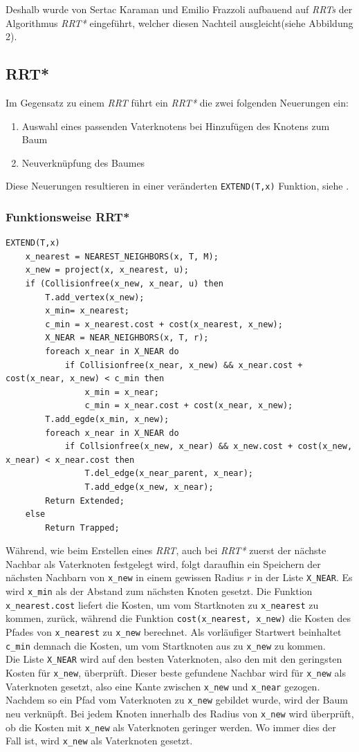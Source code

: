 Deshalb wurde von Sertac Karaman und Emilio Frazzoli aufbauend auf \textit{RRTs} der Algorithmus\textit{ RRT*} eingeführt, welcher diesen Nachteil ausgleicht(siehe Abbildung 2).
\subsection{RRT*}
\label{RRT*}
Im Gegensatz zu einem \textit{RRT} führt ein \textit{RRT*} die zwei folgenden Neuerungen ein:
\begin{enumerate}
\item Auswahl eines passenden Vaterknotens bei Hinzufügen des Knotens zum Baum
\item Neuverknüpfung des Baumes
\end{enumerate}
Diese Neuerungen resultieren in einer veränderten \verb|EXTEND(T,x)| Funktion, siehe \citep{KaFra10}.
\subsubsection{Funktionsweise RRT*}
\begin{lstlisting}
EXTEND(T,x)
	x_nearest = NEAREST_NEIGHBORS(x, T, M);
	x_new = project(x, x_nearest, u);
	if (Collisionfree(x_new, x_near, u) then
		T.add_vertex(x_new);
		x_min= x_nearest;
		c_min = x_nearest.cost + cost(x_nearest, x_new);
		X_NEAR = NEAR_NEIGHBORS(x, T, r);
		foreach x_near in X_NEAR do
			if Collisionfree(x_near, x_new) && x_near.cost + cost(x_near, x_new) < c_min then
				x_min = x_near;
				c_min = x_near.cost + cost(x_near, x_new);
		T.add_egde(x_min, x_new);
		foreach x_near in X_NEAR do
			if Collsionfree(x_new, x_near) && x_new.cost + cost(x_new, x_near) < x_near.cost then
				T.del_edge(x_near_parent, x_near);
				T.add_edge(x_new, x_near);
		Return Extended;
	else
		Return Trapped;
\end{lstlisting}

Während, wie beim Erstellen eines \textit{RRT}, auch bei \textit{RRT*} zuerst der nächste Nachbar als Vaterknoten festgelegt wird, folgt daraufhin ein Speichern der nächsten Nachbarn von \verb|x_new| in einem gewissen Radius $r$ in der Liste \verb|X_NEAR|. 
Es wird \verb|x_min| als der Abstand zum nächsten Knoten gesetzt. Die Funktion \verb|x_nearest.cost| liefert die Kosten, um vom Startknoten zu \verb|x_nearest| zu kommen, zurück, während die Funktion \verb|cost(x_nearest, x_new)| die Kosten des Pfades von \verb|x_nearest| zu \verb|x_new| berechnet. Als vorläufiger Startwert beinhaltet \verb|c_min| demnach die Kosten, um vom Startknoten aus zu \verb|x_new| zu kommen. \\
Die Liste \verb|X_NEAR| wird auf den besten Vaterknoten, also den mit den geringsten Kosten für \verb|x_new|, überprüft. Dieser beste gefundene Nachbar wird für \verb|x_new| als Vaterknoten gesetzt, also eine Kante zwischen \verb|x_new| und \verb|x_near| gezogen. \\
\label{sec:rewiring}
Nachdem so ein Pfad vom Vaterknoten zu \verb|x_new| gebildet wurde, wird der Baum neu verknüpft. Bei jedem Knoten innerhalb des Radius von \verb|x_new| wird überprüft, ob die Kosten mit \verb|x_new| als Vaterknoten geringer werden. Wo immer dies der Fall ist, wird \verb|x_new| als Vaterknoten gesetzt.
